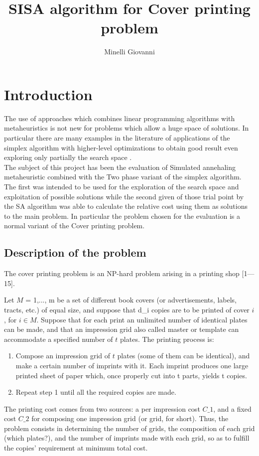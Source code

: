 ﻿\documentclass[a4paper]{article}
\title{SISA algorithm for Cover printing problem}
\author{Minelli Giovanni}
\begin{document}
\maketitle
\section{Introduction}
The use of approaches which combines linear programming algorithms with metaheuristics is not new for problems which allow a huge space of solutions. In particular there are many examples in the literature of applications of the simplex algorithm with higher-level optimizations to obtain good result even exploring only partially the search space \cite{sisa-train-formation}\cite{si-applications}\cite{salp}.\\
The subject of this project has been the evaluation of Simulated annehaling metaheuristic combined with the Two phase variant of the simplex algorithm. The first was intended to be used for the exploration of the search space and exploitation of possible solutions while the second given of those trial point by the SA algorithm was able to calculate the relative cost using them as solutions to the main problem. In particular the problem chosen for the evaluation is a normal variant of the Cover printing problem.

\subsection{Description of the problem}
The cover printing problem is an NP-hard problem \cite{np-hard} arising in a printing shop [1—15].

Let $M$ = {1,..., m} be a set of different book covers (or advertisements, labels, tracts, etc.) of equal size, and suppose that d\_i copies are to be printed of cover $i$, for $i \in M$. Suppose that for each print an unlimited number of identical plates can be made, and that an impression grid also called master or template can accommodate a specified number of $t$ plates. The printing process is:
\begin{enumerate}
\item Compose an impression grid of $t$ plates (some of them can be identical), and make a certain number of imprints with it. Each imprint produces one large printed sheet of paper which, once properly cut into t parts, yields t copies.
\item Repeat step 1 until all the required copies are made.
\end{enumerate}
The printing cost comes from two sources: a per impression cost $C\_1$, and a fixed cost $C\_2$ for composing one impression grid (or grid, for short). Thus, the problem consists in determining the number of grids, the composition of each grid (which plates?), and the number of imprints made with each grid, so as to fulfill the copies' requirement at minimum total cost.
\end{document}
